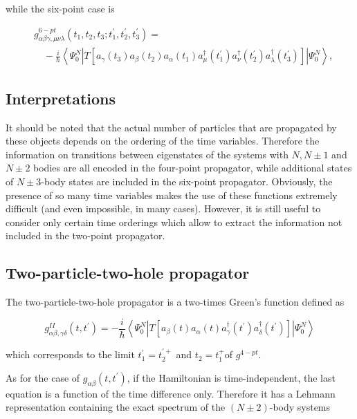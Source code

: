 {while the six-point case is

$$
\begin{aligned}
& g_{\alpha \beta \gamma, \mu \nu \lambda}^{6-p t}\left(t_{1}, t_{2}, t_{3} ; t_{1}^{\prime}, t_{2}^{\prime}, t_{3}^{\prime}\right)= \\
& \quad-\frac{i}{\hbar}\left\langle\Psi_{0}^{N}\left|T\left[a_{\gamma}\left(t_{3}\right) a_{\beta}\left(t_{2}\right) a_{\alpha}\left(t_{1}\right) a_{\mu}^{\dagger}\left(t_{1}^{\prime}\right) a_{\nu}^{\dagger}\left(t_{2}^{\prime}\right) a_{\lambda}^{\dagger}\left(t_{3}^{\prime}\right)\right]\right| \Psi_{0}^{N}\right\rangle,
\end{aligned}
$$


\subsection{Interpretations}

It should be noted that the actual number of particles that are
propagated by these objects depends on the ordering of the time
variables. Therefore the information on transitions between
eigenstates of the systems with $N, N \pm 1$ and $N \pm 2$ bodies are
all encoded in the four-point propagator, while additional states of $N \pm 3$-body
states are included in the six-point propagator. Obviously, the presence of so many
time variables makes the use of these functions extremely difficult
(and even impossible, in many cases). However, it is still useful to
consider only certain time orderings which allow to extract the
information not included in the two-point propagator.


\subsection{Two-particle-two-hole propagator}

The two-particle-two-hole propagator is a two-times Green's function
defined as

$$
g_{\alpha \beta, \gamma \delta}^{I I}\left(t, t^{\prime}\right)=-\frac{i}{\hbar}\left\langle\Psi_{0}^{N}\left|T\left[a_{\beta}(t) a_{\alpha}(t) a_{\gamma}^{\dagger}\left(t^{\prime}\right) a_{\delta}^{\dagger}\left(t^{\prime}\right)\right]\right| \Psi_{0}^{N}\right\rangle
$$

which corresponds to the limit $t_{1}^{\prime}=t_{2}^{\prime+}$ and $t_{2}=t_{1}^{+}$of $g^{4-p t}$.


As for the case of $g_{\alpha \beta}\left(t, t^{\prime}\right)$, if
the Hamiltonian is time-independent, the last equation is a function of the
time difference only. Therefore it has a Lehmann representation
containing the exact spectrum of the $(N \pm 2)$-body systems

}
